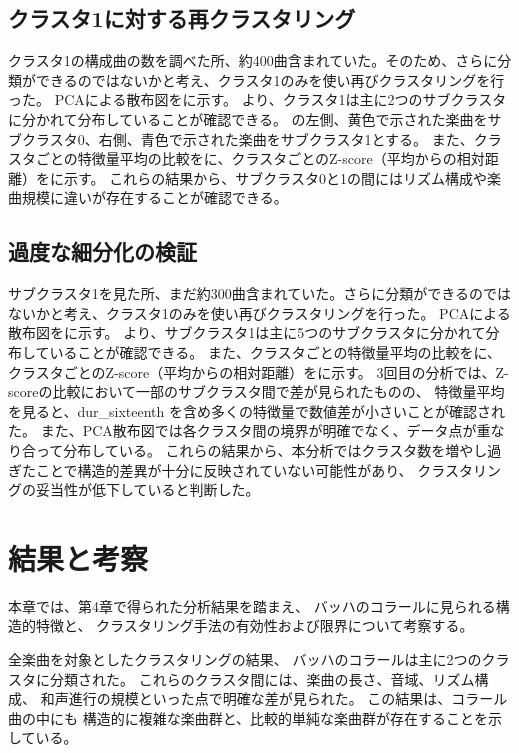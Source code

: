 \subsection{クラスタ1に対する再クラスタリング}
クラスタ1の構成曲の数を調べた所、約400曲含まれていた。そのため、さらに分類ができるのではないかと考え、クラスタ1のみを使い再びクラスタリングを行った。
PCAによる散布図をに示す。
より、クラスタ1は主に2つのサブクラスタに分かれて分布していることが確認できる。
の左側、黄色で示された楽曲をサブクラスタ0、右側、青色で示された楽曲をサブクラスタ1とする。
また、クラスタごとの特徴量平均の比較をに、クラスタごとのZ-score（平均からの相対距離）をに示す。
これらの結果から、サブクラスタ0と1の間にはリズム構成や楽曲規模に違いが存在することが確認できる。


\subsection{過度な細分化の検証}
サブクラスタ1を見た所、まだ約300曲含まれていた。さらに分類ができるのではないかと考え、クラスタ1のみを使い再びクラスタリングを行った。
PCAによる散布図をに示す。
より、サブクラスタ1は主に5つのサブクラスタに分かれて分布していることが確認できる。
また、クラスタごとの特徴量平均の比較をに、クラスタごとのZ-score（平均からの相対距離）をに示す。
3回目の分析では、Z-scoreの比較において一部のサブクラスタ間で差が見られたものの、
特徴量平均を見ると、dur\_sixteenth を含め多くの特徴量で数値差が小さいことが確認された。
また、PCA散布図では各クラスタ間の境界が明確でなく、データ点が重なり合って分布している。
これらの結果から、本分析ではクラスタ数を増やし過ぎたことで構造的差異が十分に反映されていない可能性があり、
クラスタリングの妥当性が低下していると判断した。


\section{結果と考察}
本章では、第4章で得られた分析結果を踏まえ、
バッハのコラールに見られる構造的特徴と、
クラスタリング手法の有効性および限界について考察する。

全楽曲を対象としたクラスタリングの結果、
バッハのコラールは主に2つのクラスタに分類された。
これらのクラスタ間には、楽曲の長さ、音域、リズム構成、
和声進行の規模といった点で明確な差が見られた。
この結果は、コラール曲の中にも
構造的に複雑な楽曲群と、比較的単純な楽曲群が存在することを示している。

